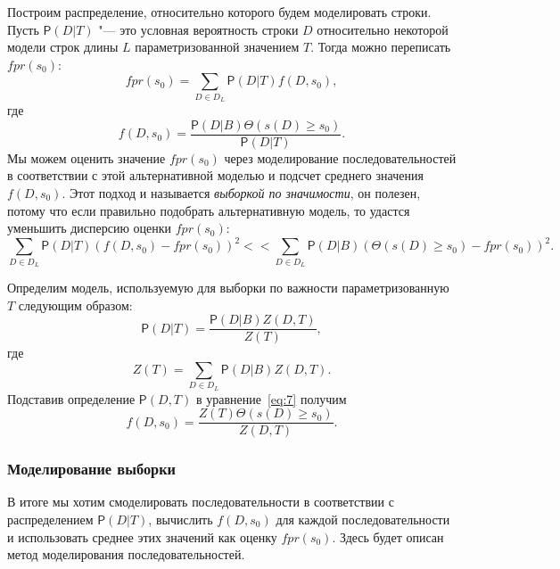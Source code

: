 \documentclass[specialist,
substylefile = spbu_report.rtx,
subf,href,colorlinks=true, 12pt]{disser}
\begin{document}
			Построим распределение, относительно которого будем моделировать строки. Пусть $\mathsf{P}(D|T)$ "--- это условная вероятность строки $D$ относительно некоторой модели строк длины $L$ параметризованной значением $T$. Тогда можно переписать $fpr(s_{0})$:
			\begin{equation*}
				fpr(s_{0}) = \sum_{D \in D_{L}} \mathsf{P}(D|T) f(D,s_{0}), \label{eq:6}
			\end{equation*}
			где
			\begin{equation}
				f(D,s_{0}) = \frac{\mathsf{P}(D|B) \Theta(s(D) \geq s_{0})}{\mathsf{P}(D|T)}. \label{eq:7}
			\end{equation}
			Мы можем оценить значение $fpr(s_{0})$ через моделирование последовательностей в соответствии с этой альтернативной моделью и подсчет среднего значения $f(D,s_{0})$. Этот подход и называется \textit{выборкой по значимости}, он полезен, потому что если правильно подобрать альтернативную модель, то удастся уменьшить дисперсию оценки $fpr(s_{0})$:
			\begin{equation*}
				\sum_{D \in D_{L}}\mathsf{P}(D|T)(f(D, s_{0})-fpr(s_{0}))^{2} <\!\!< \sum_{D \in D_{L}}\mathsf{P}(D|B)(\Theta(s(D) \geq s_{0})-fpr(s_{0}))^2. \label{eq:8}
			\end{equation*}
		
			Определим модель, используемую для выборки по важности параметризованную $T$ следующим образом:
			\begin{equation*}
				\mathsf{P}(D|T) = \frac{\mathsf{P}(D|B)Z(D,T)}{Z(T)}, \label{eq:9}
			\end{equation*}							
			где 
			\begin{equation}
				Z(T) = \sum_{D \in D_{L}}\mathsf{P}(D|B)Z(D,T). \label{eq:10}
			\end{equation}	
			Подставив определение $\mathsf{P}(D,T)$ в уравнение~\eqref{eq:7} получим 
			\begin{equation*}
				f(D,s_{0}) = \frac{Z(T)\Theta(s(D) \geq s_{0})}{Z(D,T)}. \label{eq:11}
			\end{equation*}		
		
			\subsubsection{Моделирование выборки}
			В итоге мы хотим смоделировать последовательности в соответствии с распределением $\mathsf{P}(D|T)$, вычислить $f(D, s_{0})$ для каждой последовательности и использовать среднее этих значений как оценку $fpr(s_{0})$. Здесь будет описан метод моделирования последовательностей.
			
\end{document}
